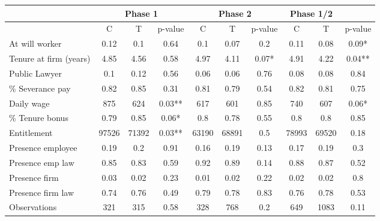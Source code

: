 \begin{tabular}{lccccccccc}
\toprule
      & \multicolumn{3}{c}{Phase 1} & \multicolumn{3}{c}{Phase 2} & \multicolumn{2}{c}{Phase 1/2} &  \\
\midrule
\midrule
      & C     & T     & p-value & C     & T     & p-value & C     & T     & p-value \\
\midrule
\midrule
At will worker & 0.12  & 0.1   & 0.64  & 0.1   & 0.07  & 0.2   & 0.11  & 0.08  & 0.09* \\
Tenure at firm (years) & 4.85  & 4.56  & 0.58  & 4.97  & 4.11  & 0.07* & 4.91  & 4.22  & 0.04** \\
Public Lawyer & 0.1   & 0.12  & 0.56  & 0.06  & 0.06  & 0.76  & 0.08  & 0.08  & 0.84 \\
\% Severance pay & 0.82  & 0.85  & 0.31  & 0.81  & 0.79  & 0.54  & 0.82  & 0.81  & 0.75 \\
Daily wage & 875   & 624   & 0.03** & 617   & 601   & 0.85  & 740   & 607   & 0.06* \\
\% Tenure bonus & 0.79  & 0.85  & 0.06* & 0.8   & 0.78  & 0.55  & 0.8   & 0.8   & 0.85 \\
Entitlement & 97526 & 71392 & 0.03** & 63190 & 68891 & 0.5   & 78993 & 69520 & 0.18 \\
Presence employee & 0.19  & 0.2   & 0.91  & 0.16  & 0.19  & 0.13  & 0.17  & 0.19  & 0.3 \\
Presence emp law & 0.85  & 0.83  & 0.59  & 0.92  & 0.89  & 0.14  & 0.88  & 0.87  & 0.52 \\
Presence firm & 0.03  & 0.02  & 0.23  & 0.01  & 0.02  & 0.22  & 0.02  & 0.02  & 0.8 \\
Presence firm law & 0.74  & 0.76  & 0.49  & 0.79  & 0.78  & 0.83  & 0.76  & 0.78  & 0.53 \\
\midrule
\midrule
Observations & 321   & 315   & 0.58  & 328   & 768   & 0.2   & 649   & 1083  & 0.11 \\
\bottomrule
\end{tabular}%
